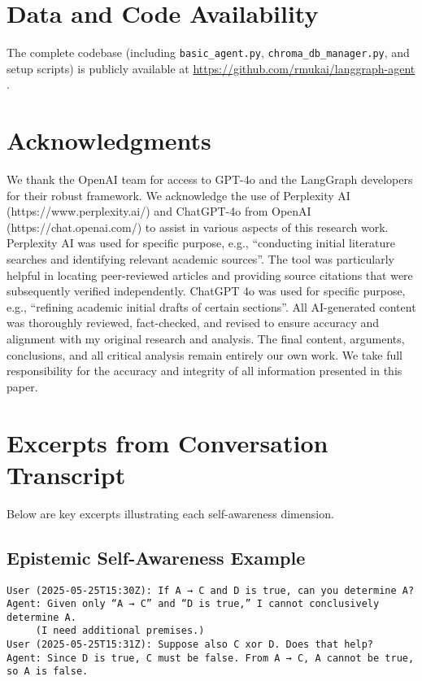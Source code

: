 \documentclass[11pt]{article}
\begin{document}
\section*{Data and Code Availability}
The complete codebase (including \texttt{basic\_agent.py}, \texttt{chroma\_db\_manager.py}, and setup scripts) is publicly available at \url{https://github.com/rmukai/langgraph-agent} \cite{LangGraphAgent2025}.


\section*{Acknowledgments}
We thank the OpenAI team for  access to GPT-4o and the LangGraph developers for their robust framework.
We acknowledge the use of Perplexity AI (https://www.perplexity.ai/) and ChatGPT-4o from OpenAI
(https://chat.openai.com/) to assist in various aspects of this research work.
Perplexity AI was used for specific purpose, e.g., “conducting initial literature searches 
and identifying relevant academic sources”. The tool was particularly helpful in 
locating peer-reviewed articles and providing source citations that were subsequently verified independently.
ChatGPT 4o was used for specific purpose, e.g., “refining academic initial drafts 
of certain sections”. All AI-generated content was thoroughly reviewed, fact-checked, 
and revised to ensure accuracy and alignment with my original research and analysis.
The final content, arguments, conclusions, and all critical analysis remain 
entirely our own work. We take full responsibility for the accuracy and integrity 
of all information presented in this paper.

\appendix
\section{Excerpts from Conversation Transcript}
Below are key excerpts illustrating each self-awareness dimension.

\subsection{Epistemic Self-Awareness Example}
\begin{verbatim}
User (2025-05-25T15:30Z): If A → C and D is true, can you determine A?
Agent: Given only “A → C” and “D is true,” I cannot conclusively determine A.
     (I need additional premises.)
User (2025-05-25T15:31Z): Suppose also C xor D. Does that help?
Agent: Since D is true, C must be false. From A → C, A cannot be true, so A is false.
\end{verbatim}
\end{document}
